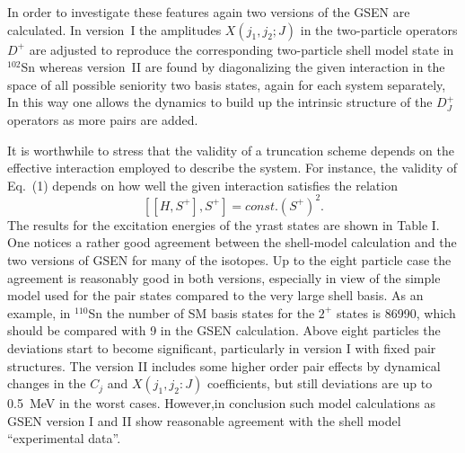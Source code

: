 In order to investigate these features again 
two versions of the GSEN are calculated. In version~I
the amplitudes $X(j_1,j_2;J)$ in the two-particle operators
$D^+$ are adjusted to reproduce the corresponding two-particle 
shell model state
in $^{102}$Sn whereas version~II are 
found by diagonalizing the given interaction
in the space of all possible seniority two basis states, again
for each system separately, In this way one allows
the dynamics to build up the intrinsic structure of the $ D_{J}^+$ operators 
as more pairs are added.

It is worthwhile to stress that the validity of a truncation scheme depends
on the effective interaction employed to describe 
the system. For instance, the validity
of Eq.\ (1) depends on how well the given interaction 
satisfies the relation  \cite{Talmi71}
\begin{equation}\label{eq:int}
   [[H,S^+],S^+]=const.(S^+)^2.    
\end{equation}
%
The results for the excitation energies of the yrast states are shown in 
Table I. One notices a rather good agreement between the 
shell-model calculation
and the two versions of GSEN for many of the isotopes. 
Up to the eight particle case 
the agreement is reasonably  good in both versions, 
especially in view of the simple model used for 
the pair states compared to the very large shell basis.  
As an example, in $^{110}$Sn the number 
of SM basis states for the $2^+$ states is 86990, 
which should be compared with 9 in the 
GSEN calculation. Above eight particles the deviations start 
to become significant, 
particularly in version I with fixed pair structures. 
The version II includes some higher
order pair effects by dynamical changes 
in the $C_j$ and $X(j_1,j_2:J)$ coefficients, 
but still deviations are up to 0.5~MeV in the worst cases. 
However,in conclusion
such model calculations as GSEN version I and II show 
reasonable agreement with the 
shell model ``experimental data''. 


